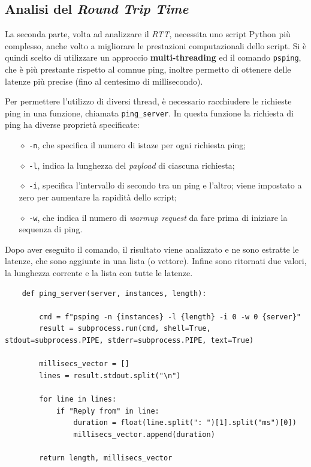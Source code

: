 \vspace{15px}\subsection{Analisi del \textsl{Round Trip Time}}\label{RTT}

La seconda parte, volta ad analizzare il \textsl{RTT}, necessita uno script Python più complesso, anche volto a migliorare le prestazioni computazionali dello script. Si è quindi scelto di utilizzare un approccio \textbf{multi-threading} ed il comando \texttt{psping}, che è più prestante rispetto al comnue ping, inoltre permetto di ottenere delle latenze più precise (fino al centesimo di millisecondo).

Per permettere l'utilizzo di diversi thread, è necessario racchiudere le richieste ping in una funzione, chiamata \texttt{ping\_server}. In questa funzione la richiesta di ping ha diverse proprietà specificate:
\vspace{-3px}
\begin{itemize}
    \setlength{\itemsep}{-2px}
    \item[$\diamond$] \texttt{-n}, che specifica il numero di istaze per ogni richiesta ping;
    \item[$\diamond$] \texttt{-l}, indica la lunghezza del \textsl{payload} di ciascuna richiesta;
    \item[$\diamond$] \texttt{-i}, specifica l'intervallo di secondo tra un ping e l'altro; viene impostato a zero per aumentare la rapidità dello script;
    \item[$\diamond$] \texttt{-w}, che indica il numero di \textsl{warmup request} da fare prima di iniziare la sequenza di ping.
\end{itemize}
\noindent Dopo aver eseguito il comando, il risultato viene analizzato e ne sono estratte le latenze, che sono aggiunte in una lista (o vettore). Infine sono ritornati due valori, la lunghezza corrente e la lista con tutte le latenze.

\begin{lstlisting}
    def ping_server(server, instances, length):

        cmd = f"psping -n {instances} -l {length} -i 0 -w 0 {server}"
        result = subprocess.run(cmd, shell=True, stdout=subprocess.PIPE, stderr=subprocess.PIPE, text=True)

        millisecs_vector = []
        lines = result.stdout.split("\n")
        
        for line in lines:
            if "Reply from" in line:
                duration = float(line.split(": ")[1].split("ms")[0])
                millisecs_vector.append(duration)
        
        return length, millisecs_vector
\end{lstlisting}

